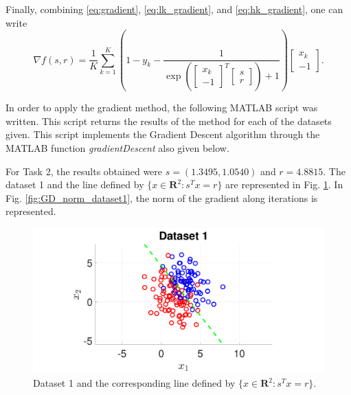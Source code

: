 \documentclass[12pt]{article}
\begin{document}
Finally, combining \eqref{eq:gradient}, \eqref{eq:lk_gradient}, and \eqref{eq:hk_gradient}, one can write
\begin{equation} \label{eq:gradient_final}
    \nabla f (s,r) = \frac{1}{K} \sum_{k=1}^K \left (1 - y_k - \frac{1}{\exp \left(
    \begin{bmatrix}
    x_k \\
    -1
    \end{bmatrix}^T
    \begin{bmatrix}
    s \\
    r
    \end{bmatrix}
    \right) + 1} \right)
    \begin{bmatrix}
    x_k \\
    -1
    \end{bmatrix}.
\end{equation}

In order to apply the gradient method, the following MATLAB script was written. This script returns the results of the method for each of the datasets given. This script implements the Gradient Descent algorithm through the MATLAB function \textit{gradientDescent} also given below.





For Task 2, the results obtained were $s=(1.3495,1.0540)$ and $r=4.8815$. The dataset 1 and the line defined by $\{ x \in \mathbf{R}^2: s^T x = r\}$ are represented in Fig. \ref{fig:GD_dataset1}. In Fig. \ref{fig:GD_norm_dataset1}, the norm of the gradient along iterations is represented.

\begin{figure}[ht!]
    \centering
    \includegraphics[width=\textwidth]{figures/GDsolDataset1.pdf}
    \caption{Dataset 1 and the corresponding line defined by $\{ x \in \mathbf{R}^2: s^T x = r\}$.}
    \label{fig:GD_dataset1}
\end{figure}
\end{document}
